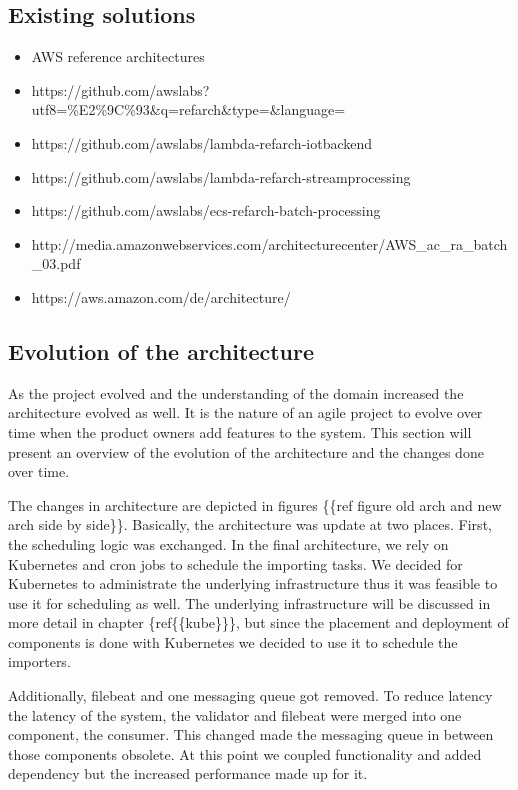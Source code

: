 \subsection{Existing solutions}\label{existing-solutions}

\begin{itemize}
\tightlist
\item
  AWS reference architectures
\item
  https://github.com/awslabs?utf8=\%E2\%9C\%93\&q=refarch\&type=\&language=
\item
  https://github.com/awslabs/lambda-refarch-iotbackend
\item
  https://github.com/awslabs/lambda-refarch-streamprocessing
\item
  https://github.com/awslabs/ecs-refarch-batch-processing
\item
  http://media.amazonwebservices.com/architecturecenter/AWS\_ac\_ra\_batch\_03.pdf
\item
  https://aws.amazon.com/de/architecture/
\end{itemize}

\subsection{Evolution of the
architecture}\label{evolution-of-the-architecture}

As the project evolved and the understanding of the domain increased the
architecture evolved as well. It is the nature of an agile project to
evolve over time when the product owners add features to the system.
This section will present an overview of the evolution of the
architecture and the changes done over time.

The changes in architecture are depicted in figures \{\{ref figure old
arch and new arch side by side\}\}. Basically, the architecture was
update at two places. First, the scheduling logic was exchanged. In the
final architecture, we rely on Kubernetes and cron jobs to schedule the
importing tasks. We decided for Kubernetes to administrate the
underlying infrastructure thus it was feasible to use it for scheduling
as well. The underlying infrastructure will be discussed in more detail
in chapter \{ref\{\{kube\}\}\}, but since the placement and deployment
of components is done with Kubernetes we decided to use it to schedule
the importers.

Additionally, filebeat and one messaging queue got removed. To reduce
latency the latency of the system, the validator and filebeat were
merged into one component, the consumer. This changed made the messaging
queue in between those components obsolete. At this point we coupled
functionality and added dependency but the increased performance made up
for it.

